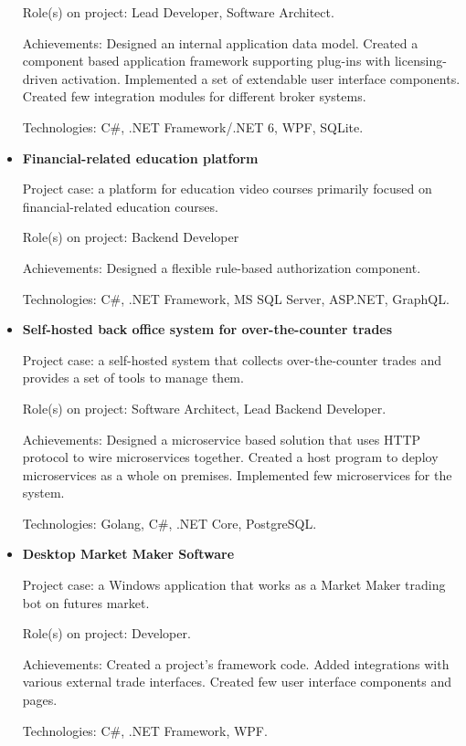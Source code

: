 \documentclass{article}
\begin{document}
\begin{itemize}
{        Role(s) on project: Lead Developer, Software Architect.
        
        Achievements:
        Designed an internal application data model.
        Created a component based application framework supporting plug-ins with licensing-driven activation.
        Implemented a set of extendable user interface components.
        Created few integration modules for different broker systems.
        
        Technologies: C\#, .NET Framework/.NET 6, WPF, SQLite.
    }
    \item {
        \textbf{Financial-related education platform}
        
        Project case: a platform for education video courses primarily focused on financial-related education courses.
        
        Role(s) on project: Backend Developer
        
        Achievements:
        Designed a flexible rule-based authorization component.
        
        Technologies: C\#, .NET Framework, MS SQL Server, ASP.NET, GraphQL.
    }
    \item {
        \textbf{Self-hosted back office system for over-the-counter trades}
        
        Project case: a self-hosted system that collects over-the-counter trades and provides a set of tools to manage them.
        
        Role(s) on project: Software Architect, Lead Backend Developer.
        
        Achievements:
        Designed a microservice based solution that uses HTTP protocol to wire microservices together.
        Created a host program to deploy microservices as a whole on premises.
        Implemented few microservices for the system.
        
        Technologies: Golang, C\#, .NET Core, PostgreSQL.
    }
    \item {
        \textbf{Desktop Market Maker Software}
        
        Project case: a Windows application that works as a Market Maker trading bot on futures market.
        
        Role(s) on project: Developer.
        
        Achievements:
        Created a project's framework code.
        Added integrations with various external trade interfaces.
        Created few user interface components and pages.
        
        Technologies: C\#, .NET Framework, WPF.
    }
\end{itemize}
\end{document}
